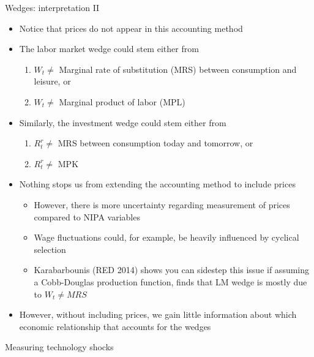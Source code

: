 \documentclass[9pt,xcolor={dvipsnames}]{beamer}
\newcommand{\bit}{\begin{itemize}}
\newcommand{\eit}{\end{itemize}}
\newcommand{\ben}{\begin{enumerate}}
\newcommand{\een}{\end{enumerate}}
\begin{document}
\begin{frame}{Wedges: interpretation II}

\bit
\setlength\itemsep{1.5em} 

\item Notice that prices do not appear in this accounting method

\item The labor market wedge could stem either from
\ben
\setlength\itemsep{0.5em} 
\item $W_t \neq$ Marginal rate of substitution (MRS) between consumption and leisure, or

\item $W_t \neq$ Marginal product of labor (MPL)
\een

\item Similarly, the investment wedge could stem either from
\ben
\setlength\itemsep{0.5em} 
\item $R^{r}_t \neq$ MRS between consumption today and tomorrow, or

\item $R^{r}_t \neq$ MPK
\een

\item Nothing stops us from extending the accounting method to include prices
\bit
\setlength\itemsep{0.5em} 
	\item However, there is more uncertainty regarding measurement of prices compared to NIPA variables
	
	\item Wage fluctuations could, for example, be heavily influenced by cyclical selection
	\item Karabarbounis (RED 2014) shows you can sidestep this issue if assuming a Cobb-Douglas production function, finds that LM wedge is mostly due to $W_t \neq MRS$
\eit

\item However, without including prices, we gain little information about which economic relationship that accounts for the wedges

\eit

\end{frame}


\begin{frame}

\begin{center}
	\huge Measuring technology shocks \normalfont
\end{center}

\end{frame}
\end{document}
